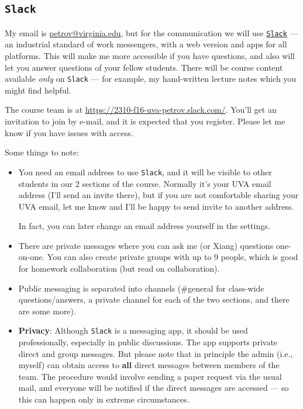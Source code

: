 \documentclass[oneside,11pt]{amsart}
\begin{document}
\subsection{\texttt{Slack}}

My email is \href{mailto:petrov@virginia.edu}{petrov@virginia.edu}, but for the communication we will use \href{https://slack.com}{\texttt{Slack}} --- an industrial standard of work messengers, with a web version and apps for all platforms. This will make me more accessible if you have questions, and also will let you answer questions of your fellow students. There will be course content available \emph{only} on \texttt{Slack} --- for example, my hand-written lecture notes which you might find helpful.

The course team is at \url{https://2310-f16-uva-petrov.slack.com/}. You'll get an invitation to join by e-mail, and it is expected that you register. Please let me know if you have issues with access. 

Some things to note:
\begin{itemize}
	\item You need an email address to use \texttt{Slack}, and it will be visible to other students in our 2 sections of the course. Normally it's your UVA email address (I'll send an invite there), but if you are not comfortable sharing your UVA email, let me know and I'll be happy to send invite to another address.

	\noindent In fact, you can later change an email address yourself in the settings.

	\item There are private messages where you can ask me (or Xiang) questions one-on-one. You can also create private groups with up to 9 people, which is good for homework collaboration (but read  on collaboration).
	\item Public messaging is separated into channels (\#general for class-wide questions/answers, a private channel for each of the two sections, and there are some more).
	\item \textbf{Privacy}: Although \texttt{Slack} is a messaging app, it should be used professionally, especially in public discussions. The app supports private direct and group messages. But please note that in principle the admin (i.e., myself) can obtain access to \textbf{all} direct messages between members of the team. The procedure would involve sending a paper request via the usual mail, and everyone will be notified if the direct messages are accessed --- so this can happen only in extreme circumstances.
\end{itemize}
\end{document}
